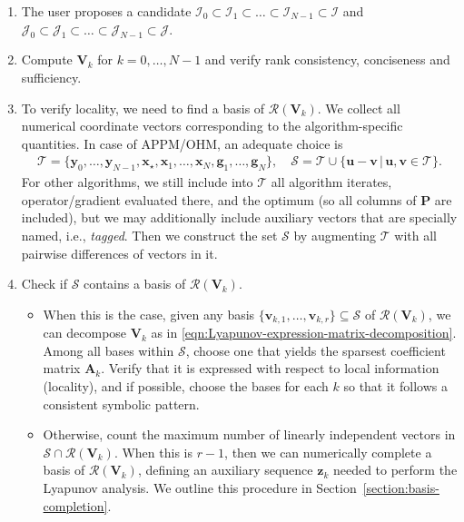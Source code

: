 \documentclass{article}
\theoremstyle{definition}
\theoremstyle{plain}
\newcommand{\vg}{{\mathbf{g}}}
\newcommand{\vu}{{\mathbf{u}}}
\newcommand{\vv}{{\mathbf{v}}}
\newcommand{\vx}{{\mathbf{x}}}
\newcommand{\vy}{{\mathbf{y}}}
\newcommand{\vz}{{\mathbf{z}}}
\newcommand{\vA}{{\mathbf{A}}}
\newcommand{\vP}{{\mathbf{P}}}
\newcommand{\vV}{{\mathbf{V}}}
\newcommand{\cI}{{\mathcal{I}}}
\newcommand{\cJ}{{\mathcal{J}}}
\newcommand{\cR}{{\mathcal{R}}}
\newcommand{\cS}{{\mathcal{S}}}
\newcommand{\cT}{{\mathcal{T}}}
\begin{document}
\begin{enumerate}
    \item The user proposes a candidate $\cI_0 \subset \cI_1 \subset \dots \subset \cI_{N-1} \subset \cI$ and $\cJ_0 \subset \cJ_1 \subset \dots \subset \cJ_{N-1} \subset \cJ$.

    \item Compute $\vV_k$ for $k=0,\dots,N-1$ and verify rank consistency, conciseness and sufficiency.

    \item To verify locality, we need to find a basis of $\cR(\vV_k)$.
    We collect all numerical coordinate vectors corresponding to the algorithm-specific quantities.
    In case of APPM/OHM, an adequate choice is
    \begin{align}
    \label{eqn:special-vector-construction}
        \cT = \{\vy_0, \dots, \vy_{N-1}, \vx_\star, \vx_1, \dots, \vx_N, \vg_1, \dots, \vg_N \} , \quad \cS = \cT \cup \{\vu - \vv \,|\, \vu, \vv \in \cT \} .
    \end{align}
    For other algorithms, we still include into $\cT$ all algorithm iterates, operator/gradient evaluated there, and the optimum (so all columns of $\vP$ are included),
    but we may additionally include auxiliary vectors that are specially named, i.e., \emph{tagged}.
    Then we construct the set $\cS$ by augmenting $\cT$ with all pairwise differences of vectors in it.
    
    \item Check if $\cS$ contains a basis of $\cR(\vV_k)$. 
    \begin{itemize}
        \item[4-1.] When this is the case, given any basis $\{\vv_{k,1},\dots,\vv_{k,r}\} \subseteq \cS$ of $\cR(\vV_k)$, we can decompose $\vV_k$ as in \eqref{eqn:Lyapunov-expression-matrix-decomposition}.
        Among all bases within $\cS$, choose one that yields the sparsest coefficient matrix $\vA_k$.
        Verify that it is expressed with respect to local information (locality), and if possible, choose the bases for each $k$ so that it follows a consistent symbolic pattern.
        
        \item[4-2.] Otherwise, count the maximum number of linearly independent vectors in $\cS \cap \cR(\vV_k)$.
        When this is $r-1$, then we can numerically complete a basis of $\cR(\vV_k)$, defining an auxiliary sequence $\vz_k$ needed to perform the Lyapunov analysis.
        We outline this procedure in Section~\ref{section:basis-completion}.


\end{itemize}
\end{enumerate}
\end{document}
